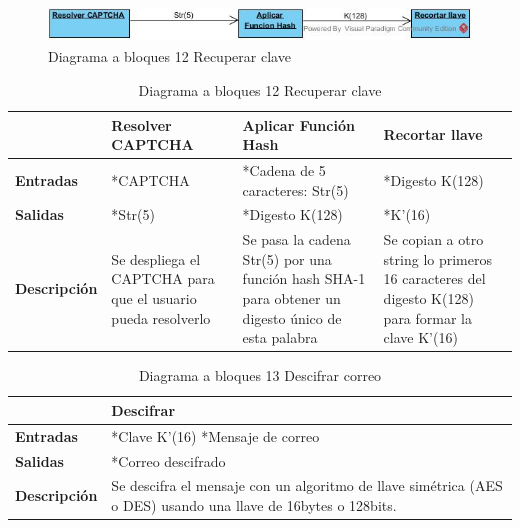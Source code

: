 \begin{figure}[H]
	\includegraphics[width=1\linewidth, height=1cm]{./images/bloques12.jpg}
	\caption{Diagrama a bloques 12 Recuperar clave}
	\label{fig:5-12-1}
\end{figure}
\begin{table}[H]
 \centering
   {
     \begin{tabular}{| p{} | p{3cm} | p{3cm} | p{3cm} |}
     \hline
     & \textbf{Resolver CAPTCHA} & \textbf{Aplicar Función Hash} & \textbf{Recortar llave}\\
     \hline
     \textbf{Entradas} & *CAPTCHA & *Cadena de 5 caracteres: Str(5) & *Digesto K(128)\\
     \hline
     \textbf{Salidas} & *Str(5) & *Digesto K(128) & *K’(16)\\
     \hline
     \textbf{Descripción} & Se despliega el CAPTCHA para que el usuario pueda resolverlo & Se pasa la cadena Str(5) por una función hash SHA-1 para obtener un digesto único de esta palabra & Se copian a otro string lo primeros 16 caracteres del digesto K(128) para formar la clave K’(16)\\

    \end{tabular}
    }
    \caption{Diagrama a bloques 12 Recuperar clave}
    \label{tabla:b12}
\end{table}
\begin{table}[H]
 \centering
   {
     \begin{tabular}{| p{} | p{3cm} |}
     \hline
     & \textbf{Descifrar}\\
     \hline
     \textbf{Entradas} & *Clave K’(16) *Mensaje de correo\\
     \hline
     \textbf{Salidas} & *Correo descifrado\\
     \hline
     \textbf{Descripción} & Se descifra el mensaje con un algoritmo de llave simétrica (AES o DES) usando una llave de 16bytes o 128bits.\\

    \end{tabular}
    }
    \caption{Diagrama a bloques 13 Descifrar correo}
    \label{tabla:b13}
\end{table}

